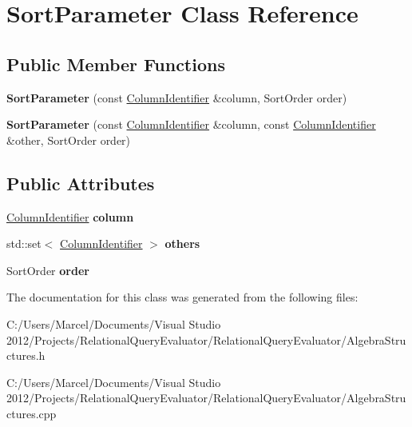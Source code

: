 \hypertarget{class_sort_parameter}{\section{Sort\+Parameter Class Reference}
\label{class_sort_parameter}
}
\subsection*{Public Member Functions}
\begin{DoxyCompactItemize}
\item 
\hypertarget{class_sort_parameter_aef62c54532ba4260cdc41dfe6157db6b}{{\bfseries Sort\+Parameter} (const \hyperlink{class_column_identifier}{Column\+Identifier} \&column, Sort\+Order order)}\label{class_sort_parameter_aef62c54532ba4260cdc41dfe6157db6b}

\item 
\hypertarget{class_sort_parameter_ae50120282e94b4918e1cf33dc1b9cc50}{{\bfseries Sort\+Parameter} (const \hyperlink{class_column_identifier}{Column\+Identifier} \&column, const \hyperlink{class_column_identifier}{Column\+Identifier} \&other, Sort\+Order order)}\label{class_sort_parameter_ae50120282e94b4918e1cf33dc1b9cc50}

\end{DoxyCompactItemize}
\subsection*{Public Attributes}
\begin{DoxyCompactItemize}
\item 
\hypertarget{class_sort_parameter_a663fa509158e2230256acb4cee4657b9}{\hyperlink{class_column_identifier}{Column\+Identifier} {\bfseries column}}\label{class_sort_parameter_a663fa509158e2230256acb4cee4657b9}

\item 
\hypertarget{class_sort_parameter_ad898e5ea54ea4599db663b480af94cfd}{std\+::set$<$ \hyperlink{class_column_identifier}{Column\+Identifier} $>$ {\bfseries others}}\label{class_sort_parameter_ad898e5ea54ea4599db663b480af94cfd}

\item 
\hypertarget{class_sort_parameter_a768e8eeb0a9857820c1596ed50c0c13a}{Sort\+Order {\bfseries order}}\label{class_sort_parameter_a768e8eeb0a9857820c1596ed50c0c13a}

\end{DoxyCompactItemize}


The documentation for this class was generated from the following files\+:\begin{DoxyCompactItemize}
\item 
C\+:/\+Users/\+Marcel/\+Documents/\+Visual Studio 2012/\+Projects/\+Relational\+Query\+Evaluator/\+Relational\+Query\+Evaluator/Algebra\+Structures.\+h\item 
C\+:/\+Users/\+Marcel/\+Documents/\+Visual Studio 2012/\+Projects/\+Relational\+Query\+Evaluator/\+Relational\+Query\+Evaluator/Algebra\+Structures.\+cpp\end{DoxyCompactItemize}
